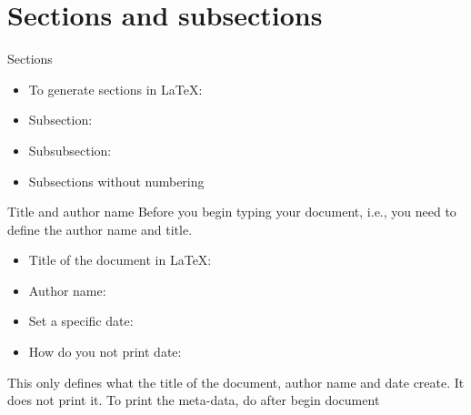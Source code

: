 \documentclass[10pt,times]{beamer}
\subtitle{Part I: Writing papers using \LaTeX}
\begin{document}
\begin{frame}
  \titlepage
\end{frame}
\section{Sections and subsections}

\begin{frame}{Sections}
\begin{itemize}
\item To generate sections in \LaTeX: 
\item Subsection: 
\item Subsubsection: 
\item Subsections without numbering 

\end{itemize}
\end{frame}

\begin{frame}{Title and author name}
Before you begin typing your document, i.e.,  you need 
to define the author name and title.
\begin{itemize}
\item Title of the document in \LaTeX: 
\item Author name: 
\item Set a specific date: 
\item How do you not print date: 
\end{itemize}
\centering
This only defines what the title of the document, author name and date create. 
It does not print it. To print the meta-data, do  after begin 
document
\end{frame}
\end{document}

